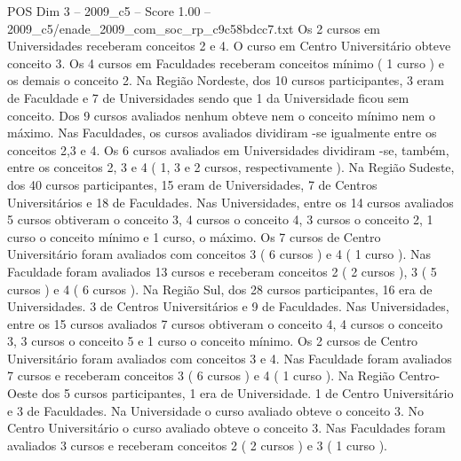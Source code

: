 \begin{textsample}{POS Dim 3 – 2009\_c5 – Score 1.00 – 2009\_c5/enade\_2009\_com\_soc\_rp\_c9c58bdcc7.txt}
Os 2 cursos em Universidades receberam conceitos 2 e 4.
O curso em Centro Universitário obteve conceito 3.
Os 4 cursos em Faculdades receberam conceitos mínimo ( 1 curso ) e os demais o conceito 2.
Na Região Nordeste, dos 10 cursos participantes, 3 eram de Faculdade e 7 de Universidades sendo que 1 da Universidade ficou sem conceito.
Dos 9 cursos avaliados nenhum obteve nem o conceito mínimo nem o máximo.
Nas Faculdades, os cursos avaliados dividiram -se igualmente entre os conceitos 2,3 e 4.
Os 6 cursos avaliados em Universidades dividiram -se, também, entre os conceitos 2, 3 e 4 ( 1, 3 e 2 cursos, respectivamente ).
Na Região Sudeste, dos 40 cursos participantes, 15 eram de Universidades, 7 de Centros Universitários e 18 de Faculdades.
Nas Universidades, entre os 14 cursos avaliados 5 cursos obtiveram o conceito 3, 4 cursos o conceito 4, 3 cursos o conceito 2, 1 curso o conceito mínimo e 1 curso, o máximo.
Os 7 cursos de Centro Universitário foram avaliados com conceitos 3 ( 6 cursos ) e 4 ( 1 curso ).
Nas Faculdade foram avaliados 13 cursos e receberam conceitos 2 ( 2 cursos ), 3 ( 5 cursos ) e 4 ( 6 cursos ).
Na Região Sul, dos 28 cursos participantes, 16 era de Universidades. 3 de Centros Universitários e 9 de Faculdades.
Nas Universidades, entre os 15 cursos avaliados 7 cursos obtiveram o conceito 4, 4 cursos o conceito 3, 3 cursos o conceito 5 e 1 curso o conceito mínimo.
Os 2 cursos de Centro Universitário foram avaliados com conceitos 3 e 4.
Nas Faculdade foram avaliados 7 cursos e receberam conceitos 3 ( 6 cursos ) e 4 ( 1 curso ).
Na Região Centro-Oeste dos 5 cursos participantes, 1 era de Universidade. 1 de Centro Universitário e 3 de Faculdades.
Na Universidade o curso avaliado obteve o conceito 3.
No Centro Universitário o curso avaliado obteve o conceito 3.
Nas Faculdades foram avaliados 3 cursos e receberam conceitos 2 ( 2 cursos ) e 3 ( 1 curso ).

\end{textsample}
